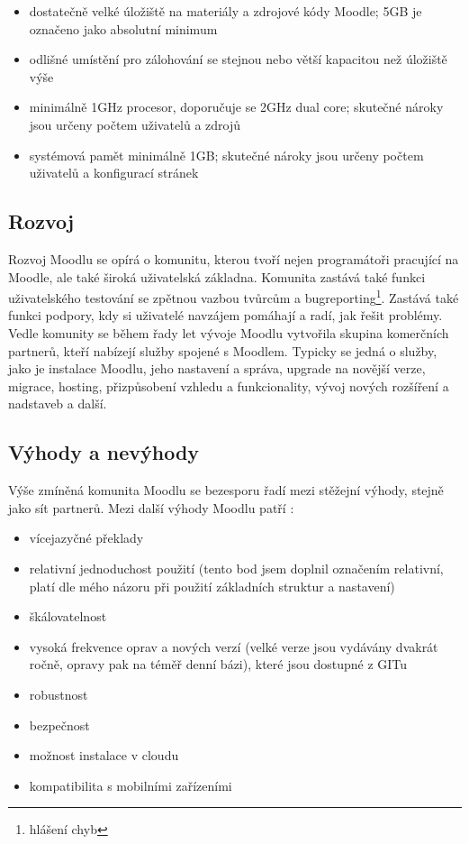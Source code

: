 \documentclass[
print,
  11pt,
  table,   
  nolof,    
  nolot,
  oneside,
  draft
]{fithesis3}
\begin{document}
\begin{itemize}
\item dostatečně velké úložiště na materiály a zdrojové kódy Moodle; 5GB je označeno jako absolutní minimum 
\item odlišné umístění pro zálohování se stejnou nebo větší kapacitou než úložiště výše
\item minimálně 1GHz procesor, doporučuje se 2GHz dual core; skutečné nároky jsou určeny počtem uživatelů a zdrojů
\item systémová pamět minimálně 1GB; skutečné nároky jsou určeny počtem uživatelů a konfigurací stránek
\end{itemize}


		\subsection{Rozvoj}
Rozvoj Moodlu se opírá o komunitu, kterou tvoří nejen programátoři pracující na Moodle, ale také široká uživatelská základna. Komunita zastává také funkci uživatelského testování se zpětnou vazbou tvůrcům a bugreporting\footnote{hlášení chyb}. Zastává také funkci podpory, kdy si uživatelé navzájem pomáhají a radí, jak řešit problémy. Vedle komunity se během řady let vývoje Moodlu vytvořila skupina komerčních partnerů, kteří nabízejí služby spojené s Moodlem. Typicky se jedná o služby, jako je instalace Moodlu, jeho nastavení a správa, upgrade na novější verze, migrace, hosting, přizpůsobení vzhledu a funkcionality, vývoj nových rozšíření a nadstaveb a další.
		\subsection{Výhody a nevýhody}
Výše zmíněná komunita Moodlu se bezesporu řadí mezi stěžejní výhody, stejně jako sít partnerů. Mezi další výhody Moodlu patří \cite{cooch}:
\begin{itemize}
\item vícejazyčné překlady
\item relativní jednoduchost použití (tento bod jsem doplnil označením relativní, platí dle mého názoru při použití základních struktur a nastavení)
\item škálovatelnost
\item vysoká frekvence oprav a nových verzí (velké verze jsou vydávány dvakrát ročně, opravy pak na téměř denní bázi), které jsou dostupné z GITu
\item robustnost
\item bezpečnost
\item možnost instalace v cloudu
\item kompatibilita s mobilními zařízeními
\end{itemize}
\end{document}
